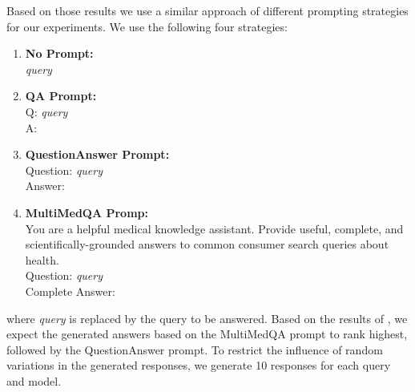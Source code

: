 Based on those results we use a similar approach of different prompting strategies for our experiments.
We use the following four strategies:
\begin{enumerate}
    \item \textbf{No Prompt:}\\ \textit{query}
    \item \textbf{QA Prompt:}\\ Q: \textit{query}\\A:
    \item \textbf{QuestionAnswer Prompt:}\\ Question: \textit{query}\\Answer:
    \item \textbf{MultiMedQA Promp:}\\ You are a helpful medical knowledge assistant. Provide useful, complete, and scientifically-grounded answers to common consumer search queries about health.\\Question: \textit{query}\\Complete Answer:
\end{enumerate}
where \textit{query} is replaced by the query to be answered.
Based on the results of \cite{reynolds:2021:Prompt}, we expect the generated answers based on the MultiMedQA prompt to rank highest, followed by the QuestionAnswer prompt.
To restrict the influence of random variations in the generated responses, we generate 10 responses for each query and model.
\\

